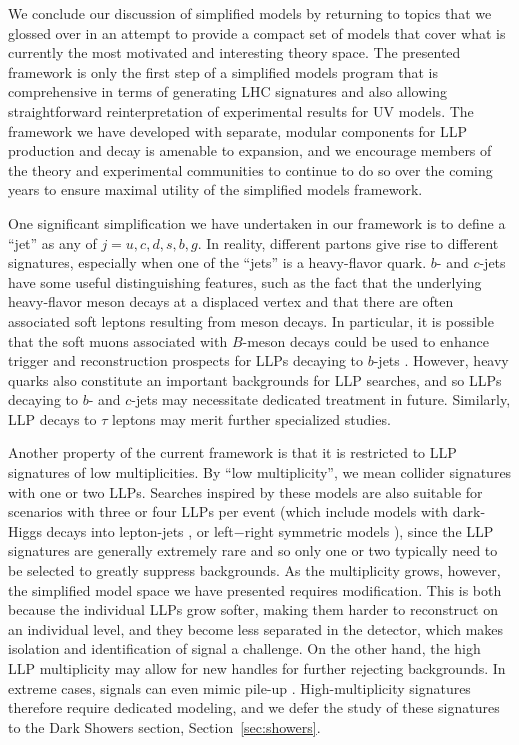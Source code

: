 We conclude our discussion of simplified models by returning to topics that we glossed over in an attempt to provide a compact set of models that cover what is currently the most motivated and interesting theory space. The presented framework is only the first step of a simplified models program that is comprehensive in terms of generating LHC signatures and also allowing straightforward reinterpretation of experimental results for UV models. The framework we have developed with separate, modular components for LLP production and decay is amenable to expansion, and we encourage members of the theory and experimental communities to continue to do so over the coming years to ensure maximal utility of the simplified models framework.

One significant simplification we have undertaken in our framework is to define a ``jet'' as any of $j=u,c,d,s,b,g$. In reality, different partons give rise to different signatures, especially when one of the ``jets'' is a heavy-flavor quark. $b$- and $c$-jets have some useful distinguishing features, such as the fact that the underlying heavy-flavor meson decays at a displaced vertex and that there are often associated soft leptons resulting from meson decays. In particular, it is possible that the soft muons associated with $B$-meson decays could be used to enhance trigger and reconstruction prospects for LLPs decaying to $b$-jets \cite{Aad:2013txa}. However, heavy quarks also constitute an important backgrounds for LLP searches, and so LLPs decaying to $b$- and $c$-jets may necessitate dedicated treatment in future. Similarly, LLP decays to $\tau$ leptons may merit further specialized studies.

Another property of the current framework is that it is restricted to LLP signatures of low multiplicities. By ``low multiplicity'', we mean collider signatures with one or two LLPs. Searches inspired by these models are also suitable for scenarios with three or four LLPs per event (which include models with dark-Higgs decays into lepton-jets \cite{Falkowski:2010cm}, or left$-$right symmetric models \cite{Nemevsek:2016enw}), since the LLP signatures are generally extremely rare and so only one or two typically need to be selected to greatly suppress backgrounds. As the multiplicity grows, however, the simplified model space we have presented requires modification. This is both because the individual LLPs grow softer, making them harder to reconstruct on an individual level, and they become less separated in the detector, which makes isolation and identification of signal a challenge. On the other hand, the high LLP multiplicity may allow for new handles for further rejecting backgrounds. In extreme cases, signals can even mimic pile-up \cite{Knapen:2016hky}. High-multiplicity signatures therefore require dedicated modeling, and we defer the study of these signatures to the Dark Showers section, Section~\ref{sec:showers}.

